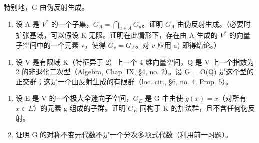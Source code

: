 特别地，G 由伪反射生成。

\begin{enumerate}
\def\labelenumi{\alph{enumi})}
\setcounter{enumi}{1}
\tightlist
\item
  设 A 是 \(V^{*}\) 的一个子集，\(G_{A} = \bigcap_{u \in A} G_{u}\)。证明 \(G_{A}\) 由伪反射生成。（必要时扩张基域，可以假设 K 无限。证明在此情形下，存在由 A 生成的 \(V^{*}\) 的向量子空间中的一个元素 v，使得 \(G_{v} = G_{A}\)。对 \(v\) 应用 a) 即得结论。）
\end{enumerate}

\begin{enumerate}
\def\labelenumi{\arabic{enumi})}
\setcounter{enumi}{8}
\tightlist
\item
  设 V 是有限域 K（特征异于 2）上一个 4 维向量空间，Q 是 V 上一个指数为 2 的非退化二次型（Algebra, Chap. IX, §4, no. 2）。设 G = O(Q) 是这个型的正交群；这是一个由反射生成的有限群（loc. cit., §6, no. 4, Prop. 5）。
\end{enumerate}

\begin{enumerate}
\def\labelenumi{\alph{enumi})}
\item
  设 E 是 V 的一个极大全迷向子空间，\(G_{E}\) 是 G 中由使 \(g(x) = x\)（对所有 \(x \in E\)）的元素 g 组成的子群。证明 \(G_{E}\) 同构于 K 的加法群，且不含任何伪反射。
\item
  证明 G 的对称不变元代数不是一个分次多项式代数（利用前一习题）。
\end{enumerate}

